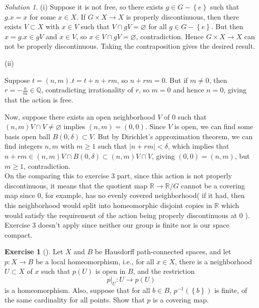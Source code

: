 \documentclass[reqno]{amsart}
\theoremstyle{definition}
\newtheorem{exercise}[theorem]{Exercise}
\theoremstyle{remark}
\newtheorem*{solution}{Solution}
\begin{document}
    \begin{solution}
        (i) 
        Suppose it is not free, so there exists $g \in G -
        \left\{ e \right\} $ such
        that $g.x = x$ for some $x \in X$. If
        $G \times X \to X$ is properly discontinuous, then
        there exists $V \subset X$ with $x \in V$ such that
        $V \cap gV = \varnothing$ for all 
        $g \in G - \left\{ e \right\} $. But then
        $x = g.x \in gV$ and $x \in V$, so
        $x \in V \cap gV = \varnothing$, contradiction. Hence
        $G \times X \to X$ can not be properly discontinuous. Taking
        the contraposition gives the desired result.

        (ii)
        
        Suppose $t = (n,m).t = t + n + rm $, so
        $n + rm = 0$. But if $m\neq 0$, then
        $r = -\frac{n}{m} \in \mathbb{Q}$, contradicting irrationality
        of $r$, so $m = 0$ and hence $n = 0$, giving that
        the action is free. 

        Now, suppose there exists an open neighborhood
        $V$ of $0$ such that
        $\left( n,m \right) V \cap V \neq \varnothing$ implies
        $\left( n,m \right)  = (0,0)$. Since $V$ is open,
        we can find some basis open ball $B\left( 0,
        \delta \right) \subset V$. But by Dirichlet's
        approximation theorem, we can find integers
        $n,m$ with $m\ge 1$ such that
        $\left| n + rm \right| < \delta$, which implies that
        $n+rm \in (n,m) V \cap B\left( 0, \delta \right) 
        \subset (n,m) V \cap V$, giving
        $ (0,0) = \left( n,m \right) $, but
        $m \ge 1$, contradiction.\\
        \linebreak
        On the comparing this to exercise 3 part,
        since this action is not properly discontinuous, it
        means that the quotient map
        $\mathbb{R} \to  \mathbb{R} /G$ cannot be a covering
        map since $0$, for example, has no evenly covered neighborhood(
        if it had, then this neighborhood would split
        into homeomorphic disjoint copies in $\mathbb{R}$ 
        which would satisfy the requirement of
        the action being properly discontinuous at  $0$ ).
        Exercise 3 doesn't apply since 
        neither our group is finite nor is our space compact.


        \begin{exercise}[]
            Let $X$ and $B$ be Hausdorff path-connected
            spaces, and let $p \colon X \to B$ be a
            local homeomorphism, i.e., for all $x \in X$,
            there is a neighborhood $U \subset X$ of
            $x$ such that $p(U)$ is open in $B$, and
            the restriction
            \[
            p|_{U} \colon U \to p(U)
            \] 
            is a homeomorphism. Also, suppose that for all
            $b \in B$, $p^{-1}\left( \left\{ b \right\}  \right) $ 
            is finite, of the same cardinality for all
            points. Show that $p$ is a covering map.
        \end{exercise}


\end{solution}
\end{document}
